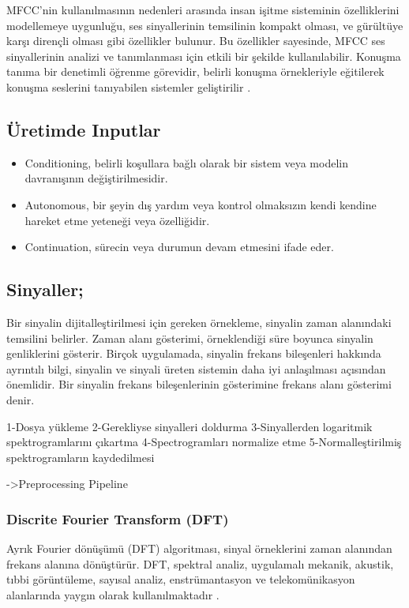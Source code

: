 \documentclass[12pt, a4paper]{article}
\begin{document}
			MFCC'nin kullanılmasının nedenleri arasında insan işitme sisteminin özelliklerini modellemeye uygunluğu, ses sinyallerinin temsilinin kompakt olması, ve gürültüye karşı dirençli olması gibi özellikler bulunur. Bu özellikler sayesinde, MFCC ses sinyallerinin analizi ve tanımlanması için etkili bir şekilde kullanılabilir. 
			Konuşma tanıma bir denetimli öğrenme görevidir, belirli konuşma örnekleriyle eğitilerek konuşma seslerini tanıyabilen sistemler geliştirilir \cite{mfcc}.	 
			
			\subsection{Üretimde Inputlar}
			\begin{itemize}
				\item Conditioning, belirli koşullara bağlı olarak bir sistem veya modelin davranışının değiştirilmesidir.
				\item Autonomous, bir şeyin dış yardım veya kontrol olmaksızın kendi kendine hareket etme yeteneği veya özelliğidir.  
				\item Continuation, sürecin veya durumun devam etmesini ifade eder.
			\end{itemize}
			\newpage
			
			\subsection{Sinyaller;} 	\vspace*{1\baselineskip}
			Bir sinyalin dijitalleştirilmesi için gereken örnekleme, sinyalin zaman alanındaki temsilini belirler. Zaman alanı gösterimi, örneklendiği süre boyunca sinyalin genliklerini gösterir. Birçok uygulamada, sinyalin frekans bileşenleri hakkında ayrıntılı bilgi, sinyalin ve sinyali üreten sistemin daha iyi anlaşılması açısından önemlidir. Bir sinyalin frekans bileşenlerinin gösterimine frekans alanı gösterimi denir.
			\vspace*{2\baselineskip}
	
				1-Dosya yükleme
				2-Gerekliyse sinyalleri doldurma
				3-Sinyallerden logaritmik spektrogramlarını çıkartma
				4-Spectrogramları normalize etme
				5-Normalleştirilmiş spektrogramların kaydedilmesi
				
				->Preprocessing Pipeline
			\cite{vvAi}
			
			\subsubsection{Discrite Fourier Transform (DFT)}	\vspace*{1\baselineskip}
			Ayrık Fourier dönüşümü (DFT) algoritması, sinyal örneklerini zaman alanından frekans alanına dönüştürür. DFT, spektral analiz, uygulamalı mekanik, akustik, tıbbi görüntüleme, sayısal analiz, enstrümantasyon ve telekomünikasyon alanlarında yaygın olarak kullanılmaktadır \cite{fft}.
			\vspace*{2\baselineskip}
			
\end{document}
